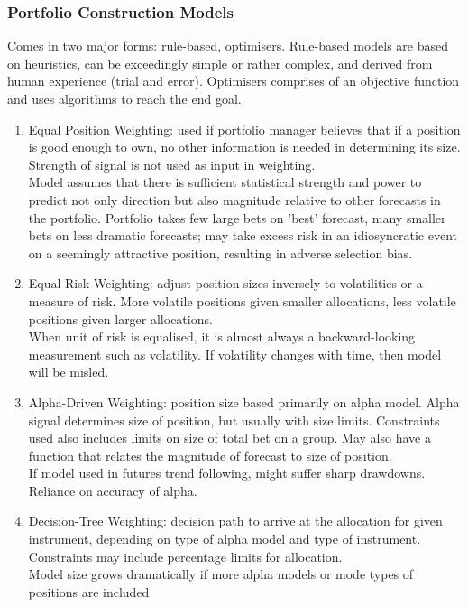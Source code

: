 \subsubsection{Portfolio Construction Models}

Comes in two major forms: rule-based, optimisers. Rule-based models are based on heuristics, can be exceedingly simple or rather complex, and derived from human experience (trial and error). Optimisers comprises of an objective function and uses algorithms to reach the end goal.

\begin{definition} 
\begin{enumerate}[label=\roman*.]
\setlength{\itemsep}{0pt}
\item Equal Position Weighting: used if portfolio manager believes that if a position is good enough to own, no other information is needed in determining its size. Strength of signal is not used as input in weighting.\\
Model assumes that there is sufficient statistical strength and power to predict not only direction but also magnitude relative to other forecasts in the portfolio. Portfolio takes few large bets on 'best' forecast, many smaller bets on less dramatic forecasts; may take excess risk in an idiosyncratic event on a seemingly attractive position, resulting in adverse selection bias.
\item Equal Risk Weighting: adjust position sizes inversely to volatilities or a measure of risk. More volatile positions given smaller allocations, less volatile positions given larger allocations.\\
When unit of risk is equalised, it is almost always a backward-looking measurement such as volatility. If volatility changes with time, then model will be misled.
\item Alpha-Driven Weighting: position size based primarily on alpha model. Alpha signal determines size of position, but usually with size limits. Constraints used also includes limits on size of total bet on a group. May also have a function that relates the magnitude of forecast to size of position.\\
If model used in futures trend following, might suffer sharp drawdowns. Reliance on accuracy of alpha.
\item Decision-Tree Weighting: decision path to arrive at the allocation for given instrument, depending on type of alpha model and type of instrument. Constraints may include percentage limits for allocation.\\
Model size grows dramatically if more alpha models or mode types of positions are included.
\end{enumerate}
\end{definition}

